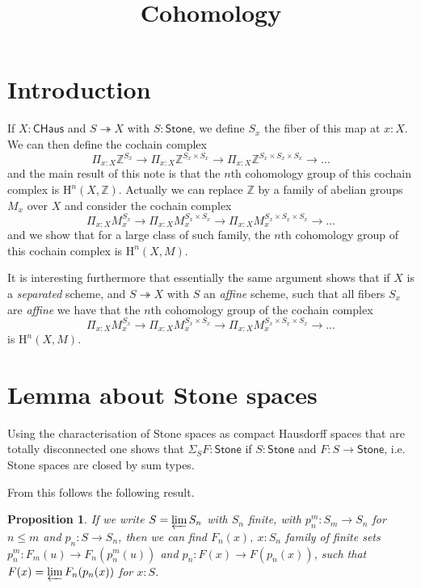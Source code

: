 \documentclass[10pt,a4paper]{article}
\newtheorem{proposition}{Proposition}[section]
\newcommand\HH{\mathrm{H}}
\newcommand{\ints}{\mathbb{Z}}
\newcommand{\Stone}{\mathsf{Stone}}
\newcommand{\CHaus}{\mathsf{CHaus}}
\newcommand{\ras}{\twoheadrightarrow}
\begin{document}
\title{Cohomology}

\author{}
\date{}
\maketitle


\section*{Introduction}

If $X:\CHaus$ and $S\ras X$ with $S:\Stone$, we define $S_x$ the fiber of this map at $x:X$. We can then define the cochain complex
\[
\Pi_{x:X}\ints^{S_x}\rightarrow \Pi_{x:X}\ints^{S_x\times S_x}\rightarrow \Pi_{x:X}\ints^{S_x\times S_x\times S_x}\rightarrow \dots
\]
and the main result of this note is that the $n$th cohomology group of this cochain complex is
$\HH^n(X,\ints)$. Actually we can replace $\ints$ by a family of abelian groups $M_x$ over $X$
and consider the cochain complex
\[
\Pi_{x:X}M_x^{S_x}\rightarrow \Pi_{x:X}M_x^{S_x\times S_x}\rightarrow \Pi_{x:X}M_x^{S_x\times S_x\times S_x}\rightarrow \dots
\]
and we show that for a large class of such family, the $n$th cohomology group of this cochain complex is
$\HH^n(X,M)$.

\medskip

It is interesting furthermore that essentially the same argument shows that if $X$ is a {\em separated}
scheme, and $S\ras X$ with $S$ an {\em affine} scheme, such that all fibers $S_x$ are {\em affine}
we have that the $n$th cohomology group of the cochain complex
\[
\Pi_{x:X}M_x^{S_x}\rightarrow \Pi_{x:X}M_x^{S_x\times S_x}\rightarrow \Pi_{x:X}M_x^{S_x\times S_x\times S_x}\rightarrow \dots
\]
is $\HH^n(X,M)$.


\section{Lemma about Stone spaces}

Using the characterisation of Stone spaces as compact Hausdorff spaces that are totally disconnected one shows
that $\Sigma_SF:\Stone$ if $S:\Stone$ and $F:S\rightarrow\Stone$, i.e. Stone spaces are closed by sum types.

From this follows the following result.

\begin{proposition}
  If we write $S = \varprojlim S_n$ with $S_n$ finite, with $p_n^m : S_m\rightarrow S_n$ for $n\leqslant m$
  and $p_n:S\rightarrow S_n$, 
  then we can find $F_n(x),~x:S_n$ family of finite sets $p_n^m:F_m(u)\rightarrow F_n(p_n^m(u))$
  and $p_n:F(x)\rightarrow F(p_n(x))$,
  such that $F(x) = \varprojlim F_n(p_n(x))$ for $x:S$.
\end{proposition}
\end{document}
